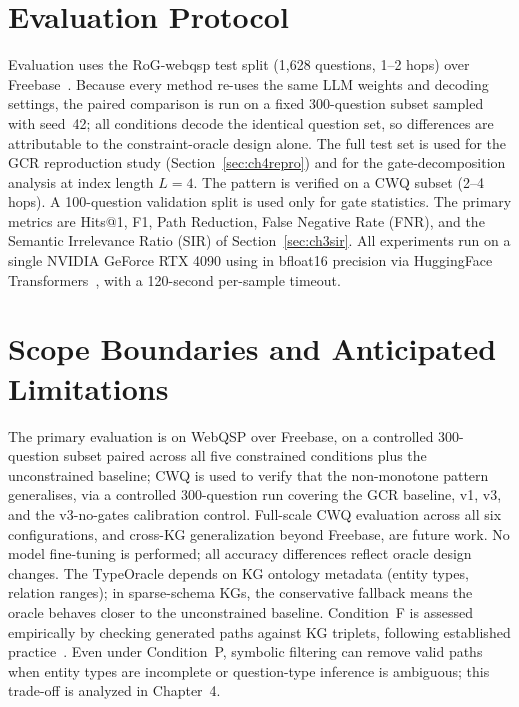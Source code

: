 \section{Evaluation Protocol}
\label{sec:ch3eval}

Evaluation uses the RoG-webqsp test split (1,628 questions, 1--2 hops) over Freebase~\citep{bollacker2008freebase, yih2016websqp}. Because every method re-uses the same LLM weights and decoding settings, the paired comparison is run on a fixed 300-question subset sampled with seed~42; all conditions decode the identical question set, so differences are attributable to the constraint-oracle design alone. The full test set is used for the GCR reproduction study (Section~\ref{sec:ch4repro}) and for the gate-decomposition analysis at index length $L{=}4$. The pattern is verified on a CWQ subset (2--4 hops). A 100-question validation split is used only for gate statistics. The primary metrics are Hits@1, F1, Path Reduction, False Negative Rate (FNR), and the Semantic Irrelevance Ratio (SIR) of Section~\ref{sec:ch3sir}. All experiments run on a single NVIDIA GeForce RTX 4090 using \modelname{} in bfloat16 precision via HuggingFace Transformers~\citep{wolf2020transformers}, with a 120-second per-sample timeout.

\section{Scope Boundaries and Anticipated Limitations}
\label{sec:ch3limitations}

The primary evaluation is on WebQSP over Freebase, on a controlled 300-question subset paired across all five constrained conditions plus the unconstrained baseline; CWQ is used to verify that the non-monotone pattern generalises, via a controlled 300-question run covering the GCR baseline, v1, v3, and the v3-no-gates calibration control. Full-scale CWQ evaluation across all six configurations, and cross-KG generalization beyond Freebase, are future work. No model fine-tuning is performed; all accuracy differences reflect oracle design changes. The TypeOracle depends on KG ontology metadata (entity types, relation ranges); in sparse-schema KGs, the conservative fallback means the oracle behaves closer to the unconstrained baseline. Condition~F is assessed empirically by checking generated paths against KG triplets, following established practice~\citep{luo2025-graph-constrained-reasoning, li2024-decoding-on-graphs}. Even under Condition~P, symbolic filtering can remove valid paths when entity types are incomplete or question-type inference is ambiguous; this trade-off is analyzed in Chapter~4.
